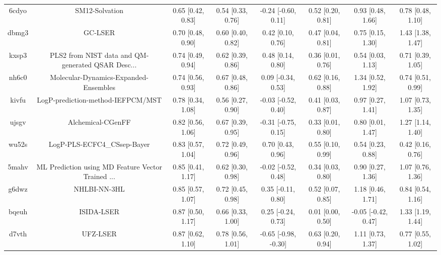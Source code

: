 \documentclass{article}
\begin{document}
\begin{center}
\begin{longtable}{|cccccccc|}
 6cdyo &                                     SM12-Solvation &  0.65 [0.42, 0.83] &  0.54 [0.33, 0.76] &   -0.24 [-0.60, 0.11] &  0.52 [0.20, 0.81] &    0.93 [0.48, 1.66] &     0.78 [0.48, 1.10] \\
 dbmg3 &                                            GC-LSER &  0.70 [0.48, 0.90] &  0.60 [0.40, 0.82] &     0.42 [0.10, 0.76] &  0.47 [0.04, 0.81] &    0.75 [0.15, 1.30] &     1.43 [1.38, 1.47] \\
 kxsp3 &  PLS2 from NIST data and QM-generated QSAR Desc... &  0.74 [0.49, 0.94] &  0.62 [0.39, 0.86] &     0.48 [0.14, 0.80] &  0.36 [0.01, 0.76] &    0.54 [0.03, 1.13] &     0.71 [0.39, 1.05] \\
 nh6c0 &              Molecular-Dynamics-Expanded-Ensembles &  0.74 [0.56, 0.93] &  0.67 [0.48, 0.86] &    0.09 [-0.34, 0.53] &  0.62 [0.16, 0.88] &    1.34 [0.52, 1.92] &     0.74 [0.51, 0.99] \\
 kivfu &                  LogP-prediction-method-IEFPCM/MST &  0.78 [0.34, 1.08] &  0.56 [0.27, 0.90] &   -0.03 [-0.52, 0.40] &  0.41 [0.03, 0.87] &    0.97 [0.27, 1.41] &     1.07 [0.73, 1.35] \\
 ujsgv &                                  Alchemical-CGenFF &  0.82 [0.56, 1.06] &  0.67 [0.39, 0.95] &   -0.31 [-0.75, 0.15] &  0.33 [0.01, 0.80] &    0.80 [0.01, 1.47] &     1.27 [1.14, 1.40] \\
 wu52s &                        LogP-PLS-ECFC4\_CSsep-Bayer &  0.83 [0.57, 1.04] &  0.72 [0.49, 0.96] &     0.70 [0.43, 0.96] &  0.55 [0.10, 0.99] &    0.54 [0.23, 0.88] &     0.42 [0.16, 0.76] \\
 5mahv &  ML Prediction using MD Feature Vector Trained ... &  0.85 [0.41, 1.17] &  0.62 [0.30, 0.98] &   -0.02 [-0.52, 0.48] &  0.34 [0.03, 0.80] &    0.90 [0.27, 1.36] &     1.07 [0.76, 1.36] \\
 g6dwz &                                       NHLBI-NN-3HL &  0.85 [0.57, 1.07] &  0.72 [0.45, 0.98] &    0.35 [-0.11, 0.80] &  0.52 [0.07, 0.85] &    1.18 [0.46, 1.71] &     0.84 [0.54, 1.16] \\
 bqeuh &                                         ISIDA-LSER &  0.87 [0.50, 1.17] &  0.66 [0.33, 1.00] &    0.25 [-0.24, 0.73] &  0.01 [0.00, 0.50] &  -0.05 [-0.42, 0.47] &     1.33 [1.19, 1.44] \\
 d7vth &                                           UFZ-LSER &  0.87 [0.62, 1.10] &  0.78 [0.56, 1.01] &  -0.65 [-0.98, -0.30] &  0.63 [0.20, 0.94] &    1.11 [0.73, 1.37] &     0.77 [0.55, 1.02] \\

\end{longtable}
\end{center}
\end{document}
